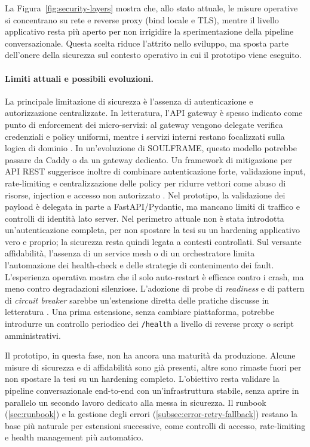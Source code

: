 La Figura~\ref{fig:security-layers} mostra che, allo stato attuale, le misure operative si concentrano su rete e reverse proxy (bind locale e TLS), mentre il livello applicativo resta più aperto per non irrigidire la sperimentazione della pipeline conversazionale. Questa scelta riduce l'attrito nello sviluppo, ma sposta parte dell'onere della sicurezza sul contesto operativo in cui il prototipo viene eseguito.

\paragraph{Limiti attuali e possibili evoluzioni.}
La principale limitazione di sicurezza è l'assenza di autenticazione e autorizzazione centralizzate. In letteratura, l'API gateway è spesso indicato come punto di enforcement dei micro-servizi: al gateway vengono delegate verifica credenziali e policy uniformi, mentre i servizi interni restano focalizzati sulla logica di dominio \cite{Xu2019APIGateway}. In un'evoluzione di SOULFRAME, questo modello potrebbe passare da Caddy o da un gateway dedicato. Un framework di mitigazione per API REST suggerisce inoltre di combinare autenticazione forte, validazione input, rate-limiting e centralizzazione delle policy per ridurre vettori come abuso di risorse, injection e accesso non autorizzato \cite{Alam2023SecuringAPIs}. Nel prototipo, la validazione dei payload è delegata in parte a FastAPI/Pydantic, ma mancano limiti di traffico e controlli di identità lato server. Nel perimetro attuale non è stata introdotta un'autenticazione completa, per non spostare la tesi su un hardening applicativo vero e proprio; la sicurezza resta quindi legata a contesti controllati. Sul versante affidabilità, l'assenza di un service mesh o di un orchestratore limita l'automazione dei health-check e delle strategie di contenimento dei fault. L'esperienza operativa mostra che il solo auto-restart è efficace contro i crash, ma meno contro degradazioni silenziose. L'adozione di probe di \emph{readiness} e di pattern di \emph{circuit breaker} sarebbe un'estensione diretta delle pratiche discusse in letteratura \cite{Barua2024FaultTolerance}. Una prima estensione, senza cambiare piattaforma, potrebbe introdurre un controllo periodico dei \texttt{/health} a livello di reverse proxy o script amministrativi.

Il prototipo, in questa fase, non ha ancora una maturità da produzione. Alcune misure di sicurezza e di affidabilità sono già presenti, altre sono rimaste fuori per non spostare la tesi su un hardening completo. L'obiettivo resta validare la pipeline conversazionale end-to-end con un'infrastruttura stabile, senza aprire in parallelo un secondo lavoro dedicato alla messa in sicurezza. Il runbook (\autoref{sec:runbook}) e la gestione degli errori (\autoref{subsec:error-retry-fallback}) restano la base più naturale per estensioni successive, come controlli di accesso, rate-limiting e health management più automatico.
\endgroup
